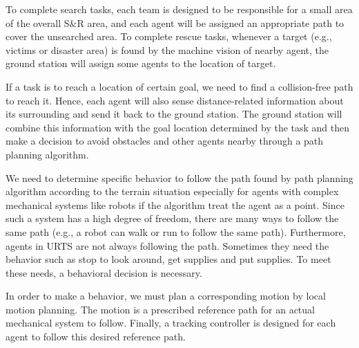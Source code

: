 \documentclass[journal,12pt,onecolumn,draftclsnofoot,]{IEEEtran}
\begin{document}
To complete search tasks, each team is designed to be responsible for a small area of the overall S\&R area, and each agent will be assigned an appropriate path to cover the unsearched area. To complete rescue tasks, whenever a target (e.g., victims or disaster area) is found by the machine vision of nearby agent, the ground station will assign some agents to the location of target. 

If a task is to reach a location of certain goal, we need to find a collision-free path to reach it. 
Hence, each agent will also sense distance-related information about its surrounding and send it back to the ground station. The ground station will combine this information with the goal location determined by the task and then make a decision to avoid obstacles and other agents nearby through a path planning algorithm.

We need to determine specific behavior to follow the path found by path planning algorithm according to the terrain situation especially for agents with complex mechanical systems like robots if the algorithm treat the agent as a point. Since such a system has a high degree of freedom, there are many ways to follow the same path (e.g., a robot can walk or run to follow the same path). Furthermore, agents in URTS are not always following the path. Sometimes they need the behavior such as stop to look around, get supplies and put supplies. To meet these needs, a behavioral decision is necessary.

In order to make a behavior, we must plan a corresponding motion by local motion planning. The motion is a prescribed reference path for an actual mechanical system to follow. Finally, a tracking controller is designed for each agent to follow this desired reference path.
\end{document}
